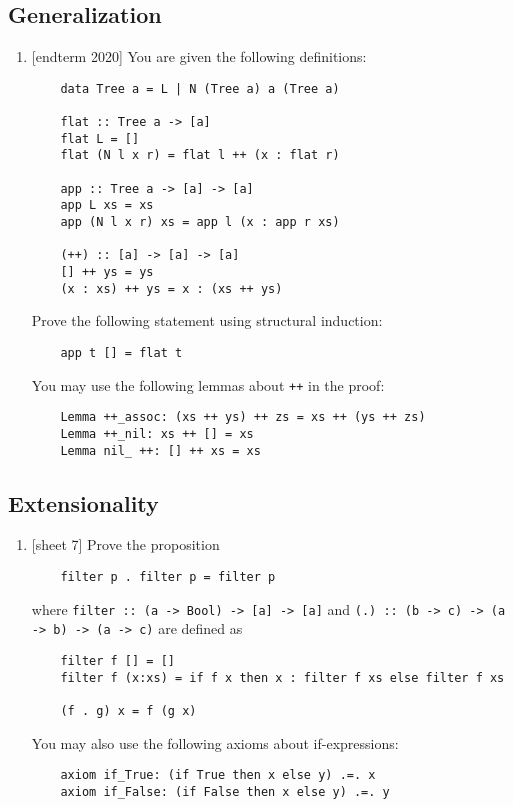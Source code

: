 \documentclass{article}
\def\code#1{\texttt{#1}}
\begin{document}
\subsection{Generalization}
\begin{enumerate}
    \item {[endterm 2020]} You are given the following definitions:
        \begin{verbatim}
    data Tree a = L | N (Tree a) a (Tree a)

    flat :: Tree a -> [a]
    flat L = []
    flat (N l x r) = flat l ++ (x : flat r)

    app :: Tree a -> [a] -> [a]
    app L xs = xs
    app (N l x r) xs = app l (x : app r xs)

    (++) :: [a] -> [a] -> [a]
    [] ++ ys = ys
    (x : xs) ++ ys = x : (xs ++ ys)
        \end{verbatim}
        Prove the following statement using structural induction:
        \begin{verbatim}
    app t [] = flat t
        \end{verbatim}
        You may use the following lemmas about \code{++} in the proof:
        \begin{verbatim}
    Lemma ++_assoc: (xs ++ ys) ++ zs = xs ++ (ys ++ zs)
    Lemma ++_nil: xs ++ [] = xs
    Lemma nil_ ++: [] ++ xs = xs
        \end{verbatim}
\end{enumerate}

\subsection{Extensionality}
\begin{enumerate}
    \item {[sheet 7]} Prove the proposition
        \begin{verbatim}
    filter p . filter p = filter p
        \end{verbatim}
        where \code{filter :: (a -> Bool) -> [a] -> [a]} and \code{(.) :: (b -> c) -> (a -> b) -> (a -> c)} are defined as
        \begin{verbatim}
    filter f [] = []
    filter f (x:xs) = if f x then x : filter f xs else filter f xs

    (f . g) x = f (g x)
        \end{verbatim}
        You may also use the following axioms about if-expressions:
        \begin{verbatim}
    axiom if_True: (if True then x else y) .=. x
    axiom if_False: (if False then x else y) .=. y
        \end{verbatim}
\end{enumerate}
\end{document}
